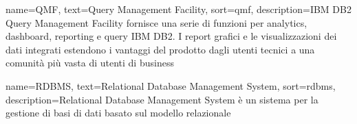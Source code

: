 

{
    name=QMF,
    text=Query Management Facility,
    sort=qmf,
    description={IBM DB2 Query Management Facility fornisce una serie di funzioni per analytics, dashboard, reporting e query IBM DB2. I report grafici e le visualizzazioni dei dati integrati estendono i vantaggi del prodotto dagli utenti tecnici a una comunità più vasta di utenti di business}
}


{
    name=RDBMS,
    text=Relational Database Management System,
    sort=rdbms,
    description={Relational Database Management System è un sistema per la gestione di basi di dati basato sul modello relazionale}
}



